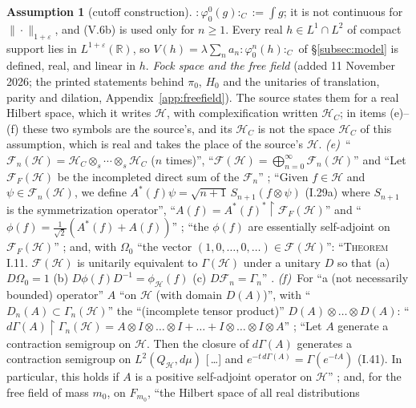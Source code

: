 \documentclass[11pt,a4paper]{article}
\theoremstyle{plain}
\theoremstyle{definition}
\newtheorem{assumption}{Assumption}
\theoremstyle{plain}
\theoremstyle{definition}
\newcommand{\R}{\mathbb{R}}
\newcommand{\HH}{\mathcal{H}}
\begin{document}
\begin{assumption}[cutoff construction]
${:}\varphi_0^0(g){:}_C:=\int g$; it is not continuous for $\|\cdot\|_{1+\varepsilon}$, and
(V.6b) is used only for $n\ge1$.  Every real $h\in L^1\cap L^2$ of compact support lies in
$L^{1+\varepsilon}(\R)$, so $V(h)=\lambda\sum_na_n{:}\varphi_0^n(h){:}_C$ of
\S\ref{subsec:model} is defined, real, and linear in $h$.
\emph{Fock space and the free field} (added 11 November 2026; the printed statements behind
$\pi_0$, $H_0$ and the unitaries of translation, parity and dilation,
Appendix~\ref{app:freefield}).  The source states them for a real Hilbert space, which it
writes $\mathcal H$, with complexification written $\mathcal H_C$; in items (e)--(f) these two
symbols are the source's, and its $\mathcal H_C$ is not the space $\HH_C$ of this assumption,
which is real and takes the place of the source's $\mathcal H$.
\emph{(e)}~``$\mathcal F_n(\mathcal H)=\mathcal H_C\otimes_s\cdots\otimes_s\mathcal H_C$
($n$ times)'', ``$\mathcal F(\mathcal H)=\bigoplus_{n=0}^\infty\mathcal F_n(\mathcal H)$''
and ``Let $\mathcal F_F(\mathcal H)$ be the incompleted direct sum of the $\mathcal F_n$''
\cite[(I.28), p.~23]{SimonBook}; ``Given $f\in\mathcal H$ and $\psi\in\mathcal F_n(\mathcal
H)$, we define $A^*(f)\psi=\sqrt{n+1}\,S_{n+1}(f\otimes\psi)$ (I.29a) where $S_{n+1}$ is the
symmetrization operator'', ``$A(f)=A^*(f)^*\upharpoonright\mathcal F_F(\mathcal H)$'' and
``$\phi(f)=\frac1{\sqrt2}(A^*(f)+A(f))$'' \cite[(I.29), pp.~23--24]{SimonBook}; ``the
$\phi(f)$ are essentially self-adjoint on $\mathcal F_F(\mathcal H)$''
\cite[p.~24]{SimonBook}; and, with $\Omega_0$ ``the vector $(1,0,\dots,0,\dots)\in\mathcal
F(\mathcal H)$'': ``\textsc{Theorem I.11.} $\mathcal F(\mathcal H)$ is unitarily equivalent
to $\Gamma(\mathcal H)$ under a unitary $D$ so that (a) $D\Omega_0=1$ (b)
$D\phi(f)D^{-1}=\phi_{\mathcal H}(f)$ (c) $D\mathcal F_n=\Gamma_n$'' \cite[p.~24]{SimonBook}.
\emph{(f)}~For ``a (not necessarily bounded) operator'' $A$ ``on $\mathcal H$ (with domain
$D(A)$)'', with ``$D_n(A)\subset\Gamma_n(\mathcal H)$'' the ``(incomplete tensor product)''
$D(A)\otimes\dots\otimes D(A)$: ``$d\Gamma(A)\upharpoonright\Gamma_n(\mathcal H)=A\otimes
I\otimes\dots\otimes I+\dots+I\otimes\dots\otimes I\otimes A$'' \cite[(I.40),
p.~31]{SimonBook}; ``Let $A$ generate a contraction semigroup on $\mathcal H$.  Then the
closure of $d\Gamma(A)$ generates a contraction semigroup on $L^2(Q_{\mathcal H},d\mu)$
[\,\dots] and $e^{-t\,d\Gamma(A)}=\Gamma(e^{-tA})$ (I.41).  In particular, this holds if $A$
is a positive self-adjoint operator on $\mathcal H$'' \cite[Example 3, p.~32]{SimonBook}; and,
for the free field of mass $m_0$, on $F_{m_0}$, ``the Hilbert space of all real distributions

\end{assumption}
\end{document}
